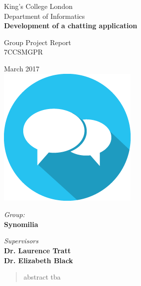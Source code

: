 \documentclass[10pt,a4paper,oneside]{report}
\author{Synomilia}
\begin{document}
\thispagestyle{empty}

\begin{center}
\large
King's College London\\
Department of Informatics\\[2cm]

{\huge \bfseries Development of a chatting application}\\[2cm]

\begin{center}
	\Large Group Project Report \\%
	7CCSMGPR 
\end{center}

March 2017\\[2cm]

\includegraphics[width=.4\linewidth]{chat-2-icon.png}\\[4cm]

\begin{minipage}{.49\textwidth}
	\begin{flushleft}
		\textit{Group:}\\
		\textbf{Synomilia}\\
	\end{flushleft}
\end{minipage}
\begin{minipage}{.49\textwidth}
	\begin{flushright}
			\textit{Supervisors}\\ 
			\textbf{Dr. Laurence Tratt}\\
			\textbf{Dr. Elizabeth Black} 
	\end{flushright}
\end{minipage}

\end{center}

\begin{abstract}
abstract tba
\end{abstract}
\tableofcontents


%









%

%
\end{document}
